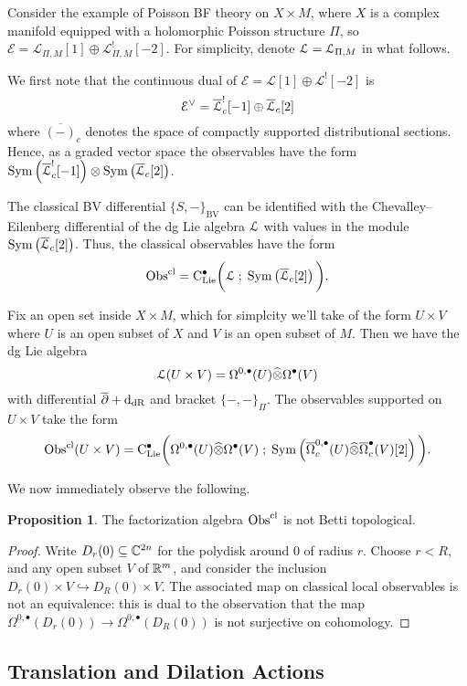 \documentclass[11pt, oneside, reqno]{amsart}
\theoremstyle{definition} \newtheorem{definition}{Definition}[section]
\newtheorem{prop}[definition]{Proposition}
\theoremstyle{definition}
\theoremstyle{remark}
\theoremstyle{definition} \newtheorem{remark}[definition]{Remark}
\theoremstyle{definition} \newtheorem{remarks}[definition]{Remarks}
\theoremstyle{definition} \newtheorem{question}[definition]{Question}
\theoremstyle{definition} \newtheorem*{note}{Note}
\theoremstyle{definition} \newtheorem{example}[definition]{Example}
\theoremstyle{definition} \newtheorem{examples}[definition]{Examples}
\def\clie{{\rm C}_{\rm Lie}}
\def\bu{\bullet}
\def\Bar{\overline}
\def\Hat{\widehat}
\def\Sym{{\rm Sym}}
\def\cE{\mathcal E}\def\cF{\mathcal F}\def\cG{\mathcal G}\def\cH{\mathcal H}
\newcommand{\dbar}{\overline{\partial}}
\newcommand{\sub}{\subseteq}
\newcommand{\inj}{\hookrightarrow}
\newcommand{\mr}[1]{\mathrm{#1}}
\newcommand{\mc}[1]{\mathcal{#1}}
\def\d{{\rm d}}
\newcommand{\Obs}{\mathrm{Obs}}
\begin{document}
Consider the example of Poisson BF theory on $X \times M$, where $X$ is a complex manifold equipped with a holomorphic Poisson structure $\Pi$, so $\mc E = \mc L_{\Pi, M} [1] \oplus \mc L^!_{\Pi, M}[-2]$.  
For simplicity, denote $\mathcal L = \mathcal L_{\Pi,M}$ in what follows.

We first note that the continuous dual of $\mc E = \mc L [1] \oplus \mc L^![-2]$ is 
\[
\cE^\vee = \Bar{\cL}^!_c [-1]  \oplus \Bar{\mc L}_c [2] 
\]
where $\Bar{(-)}_c$ denotes the space of compactly supported distributional sections.
Hence, as a graded vector space the observables have the form $\Sym\left(\Bar{\cL}^!_c [-1]\right)  \otimes \Sym\left(\Bar{\mc L}_c [2]\right)$.  

The classical BV differential $\{S,-\}_{\mr{BV}}$ can be identified with the Chevalley--Eilenberg differential of the dg Lie algebra $\mathcal L$ with values in the module $\Sym \left(\Bar{\cL}_c[2] \right)$. 
Thus, the classical observables have the form
\[
\Obs^{\rm cl} = \clie^\bu \bigg(\cL \; ; \; \Sym \left(\Bar{\cL}_c [2]\right) \bigg) .
\]

Fix an open set inside $X \times M$, which for simplcity we'll take of the form $U \times V$ where $U$ is an open subset of $X$ and $V$ is an open subset of $M$.   
Then we have the dg Lie algebra
\[
\cL (U \times V) = \Omega^{0,\bu}(U) \Hat{\otimes} \Omega^\bu(V) 
\]
with differential $\dbar + \d_{\rm dR}$ and bracket $\{-,-\}_\Pi$.
The observables supported on $U \times V$ take the form
\[ 
\Obs^{\rm cl} (U \times V) = \clie^\bu \bigg(\Omega^{0,\bu}(U) \Hat{\otimes} \Omega^\bu(V) \; ; \; \Sym \left(\Bar{\Omega}_c^{0,\bu}(U) \Hat{\otimes} \Bar{\Omega}_c^\bu(V) [2]\right) \bigg) .
\]

We now immediately observe the following.

\begin{prop}
The factorization algebra $\Obs^{\rm cl}$ is not Betti topological.
\end{prop}

\begin{proof}
Write $D_r(0) \sub \CC^{2n}$ for the polydisk around 0 of radius $r$.  Choose $r < R$, and any open subset $V$ of $\mathbb R^m$, and consider the inclusion $D_r(0) \times V \inj D_R(0) \times V$.  The associated map on classical local observables is not an equivalence: this is dual to the observation that the map $\Omega^{0,\bu}(D_r(0)) \to \Omega^{0,\bu}(D_R(0))$ is not surjective on cohomology.
\end{proof}

\subsection{Translation and Dilation Actions} \label{translation_section}
\end{document}
